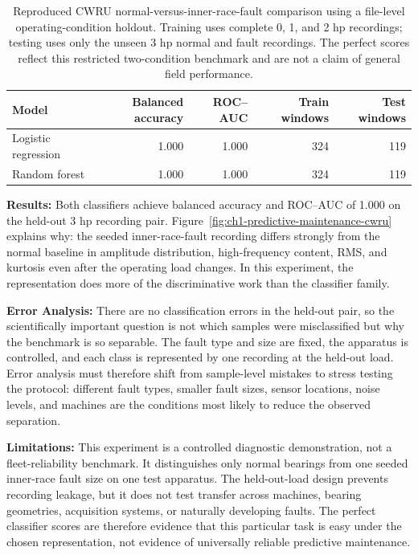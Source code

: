 \begin{table}[t]
\centering
\small
\caption{Reproduced CWRU normal-versus-inner-race-fault comparison using a file-level operating-condition holdout. Training uses complete 0, 1, and 2 hp recordings; testing uses only the unseen 3 hp normal and fault recordings. The perfect scores reflect this restricted two-condition benchmark and are not a claim of general field performance.}
\label{tab:ch1-predictive-maintenance-benchmark}
\begin{tabular}{lrrrr}
\toprule
Model & Balanced accuracy & ROC--AUC & Train windows & Test windows \\
\midrule
Logistic regression & 1.000 & 1.000 & 324 & 119 \\
Random forest & 1.000 & 1.000 & 324 & 119 \\
\bottomrule
\end{tabular}
\end{table}

\textbf{Results:} Both classifiers achieve balanced accuracy and ROC--AUC of 1.000 on the held-out 3 hp recording pair. Figure~\ref{fig:ch1-predictive-maintenance-cwru} explains why: the seeded inner-race-fault recording differs strongly from the normal baseline in amplitude distribution, high-frequency content, RMS, and kurtosis even after the operating load changes. In this experiment, the representation does more of the discriminative work than the classifier family.

\textbf{Error Analysis:} There are no classification errors in the held-out pair, so the scientifically important question is not which samples were misclassified but why the benchmark is so separable. The fault type and size are fixed, the apparatus is controlled, and each class is represented by one recording at the held-out load. Error analysis must therefore shift from sample-level mistakes to stress testing the protocol: different fault types, smaller fault sizes, sensor locations, noise levels, and machines are the conditions most likely to reduce the observed separation.

\textbf{Limitations:} This experiment is a controlled diagnostic demonstration, not a fleet-reliability benchmark. It distinguishes only normal bearings from one seeded inner-race fault size on one test apparatus. The held-out-load design prevents recording leakage, but it does not test transfer across machines, bearing geometries, acquisition systems, or naturally developing faults. The perfect classifier scores are therefore evidence that this particular task is easy under the chosen representation, not evidence of universally reliable predictive maintenance.

